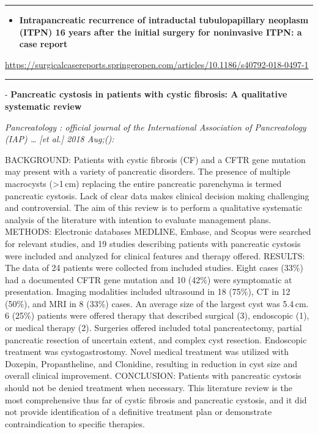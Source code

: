\documentclass[]{article}
\providecommand{\tightlist}{%
  \setlength{\itemsep}{0pt}\setlength{\parskip}{0pt}}
\begin{document}
{}

{}

\begin{center}\rule{0.5\linewidth}{\linethickness}\end{center}

\begin{itemize}
\tightlist
\item
  \textbf{Intrapancreatic recurrence of intraductal tubulopapillary
  neoplasm (ITPN) 16 years after the initial surgery for noninvasive
  ITPN: a case report}
\end{itemize}

\url{https://surgicalcasereports.springeropen.com/articles/10.1186/s40792-018-0497-1}

\begin{center}\rule{0.5\linewidth}{\linethickness}\end{center}

 - \textbf{Pancreatic cystosis in patients with cystic fibrosis: A
qualitative systematic review}

\emph{Pancreatology : official journal of the International Association
of Pancreatology (IAP) \ldots{} {[}et al.{]} 2018 Aug;():}

BACKGROUND: Patients with cystic fibrosis (CF) and a CFTR gene mutation
may present with a variety of pancreatic disorders. The presence of
multiple macrocysts (\textgreater{}1\,cm) replacing the entire
pancreatic parenchyma is termed pancreatic cystosis. Lack of clear data
makes clinical decision making challenging and controversial. The aim of
this review is to perform a qualitative systematic analysis of the
literature with intention to evaluate management plans. METHODS:
Electronic databases MEDLINE, Embase, and Scopus were searched for
relevant studies, and 19 studies describing patients with pancreatic
cystosis were included and analyzed for clinical features and therapy
offered. RESULTS: The data of 24 patients were collected from included
studies. Eight cases (33\%) had a documented CFTR gene mutation and 10
(42\%) were symptomatic at presentation. Imaging modalities included
ultrasound in 18 (75\%), CT in 12 (50\%), and MRI in 8 (33\%) cases. An
average size of the largest cyst was 5.4\,cm. 6 (25\%) patients were
offered therapy that described surgical (3), endoscopic (1), or medical
therapy (2). Surgeries offered included total pancreatectomy, partial
pancreatic resection of uncertain extent, and complex cyst resection.
Endoscopic treatment was cystogastrostomy. Novel medical treatment was
utilized with Doxepin, Propantheline, and Clonidine, resulting in
reduction in cyst size and overall clinical improvement. CONCLUSION:
Patients with pancreatic cystosis should not be denied treatment when
necessary. This literature review is the most comprehensive thus far of
cystic fibrosis and pancreatic cystosis, and it did not provide
identification of a definitive treatment plan or demonstrate
contraindication to specific therapies.
\end{document}
